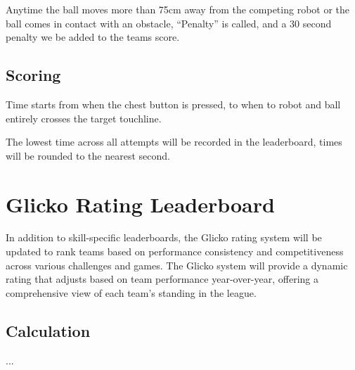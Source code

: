 Anytime the ball moves more than 75cm away from the competing robot or the ball comes in contact with
an obstacle,  ``Penalty'' is called, and a 30 second penalty we be added to the teams score.

\subsection{Scoring}
Time starts from when the chest button is pressed, to when to robot and ball entirely crosses the target touchline.

The lowest time across all attempts will be recorded in the leaderboard, times will be rounded to the nearest second.

\section{Glicko Rating Leaderboard}
In addition to skill-specific leaderboards, the Glicko rating system will be updated to rank teams based on
performance consistency and competitiveness across various challenges and games.
The Glicko system will provide a dynamic rating that adjusts based on team performance
year-over-year, offering a comprehensive view of each team's standing in the league.

\subsection{Calculation}
...
